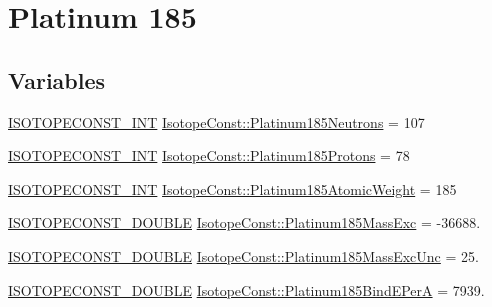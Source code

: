 \hypertarget{group___isotope_const-_platinum-_pt185}{}\section{Platinum 185}
\label{group___isotope_const-_platinum-_pt185}
\subsection*{Variables}
\begin{DoxyCompactItemize}
\item 
\mbox{\hyperlink{group___isotope_const-_macros_ga5f18360b3e99483a35c32d789e62621c}{I\+S\+O\+T\+O\+P\+E\+C\+O\+N\+S\+T\+\_\+\+I\+NT}} \mbox{\hyperlink{group___isotope_const-_platinum-_pt185_ga6d44aafdf5c30ee930c36e58cd089fe7}{Isotope\+Const\+::\+Platinum185\+Neutrons}} = 107
\item 
\mbox{\hyperlink{group___isotope_const-_macros_ga5f18360b3e99483a35c32d789e62621c}{I\+S\+O\+T\+O\+P\+E\+C\+O\+N\+S\+T\+\_\+\+I\+NT}} \mbox{\hyperlink{group___isotope_const-_platinum-_pt185_ga3918d8596054baec629dc6fd36fa1b17}{Isotope\+Const\+::\+Platinum185\+Protons}} = 78
\item 
\mbox{\hyperlink{group___isotope_const-_macros_ga5f18360b3e99483a35c32d789e62621c}{I\+S\+O\+T\+O\+P\+E\+C\+O\+N\+S\+T\+\_\+\+I\+NT}} \mbox{\hyperlink{group___isotope_const-_platinum-_pt185_gad721f0f60e95dd5baed958e2af78084e}{Isotope\+Const\+::\+Platinum185\+Atomic\+Weight}} = 185
\item 
\mbox{\hyperlink{group___isotope_const-_macros_ga8f45a7272ce02c0b4c65c44636ed719a}{I\+S\+O\+T\+O\+P\+E\+C\+O\+N\+S\+T\+\_\+\+D\+O\+U\+B\+LE}} \mbox{\hyperlink{group___isotope_const-_platinum-_pt185_ga7e463410cb497c784ab6ad74641240c0}{Isotope\+Const\+::\+Platinum185\+Mass\+Exc}} = -\/36688.
\item 
\mbox{\hyperlink{group___isotope_const-_macros_ga8f45a7272ce02c0b4c65c44636ed719a}{I\+S\+O\+T\+O\+P\+E\+C\+O\+N\+S\+T\+\_\+\+D\+O\+U\+B\+LE}} \mbox{\hyperlink{group___isotope_const-_platinum-_pt185_ga023cce3ac9dd6bf01365f78c5d746297}{Isotope\+Const\+::\+Platinum185\+Mass\+Exc\+Unc}} = 25.
\item 
\mbox{\hyperlink{group___isotope_const-_macros_ga8f45a7272ce02c0b4c65c44636ed719a}{I\+S\+O\+T\+O\+P\+E\+C\+O\+N\+S\+T\+\_\+\+D\+O\+U\+B\+LE}} \mbox{\hyperlink{group___isotope_const-_platinum-_pt185_gaa2d7f90a13ad049420d322272f0a9dcd}{Isotope\+Const\+::\+Platinum185\+Bind\+E\+PerA}} = 7939.
\item 

\end{DoxyCompactItemize}
